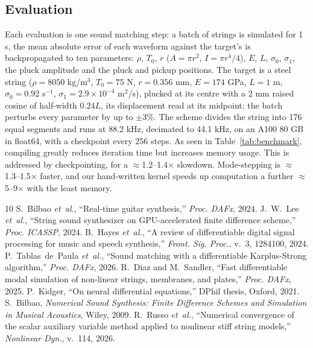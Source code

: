 \documentclass[a4paper]{article}
\newcommand{\step}{\rotatebox[origin=c]{180}{$\Lsh$}}
\begin{document}
\begin{sloppy}
\section{Evaluation}
Each evaluation is one sound matching step: a batch of strings is simulated
for 1 s, the mean absolute error of each waveform against the target's is backpropagated to ten parameters:
$\rho$, $T_0$, $r$ ($A=\pi r^2$, $I=\pi r^4/4$), $E$, $L$, $\sigma_0$,
$\sigma_1$, the pluck amplitude and the pluck and pickup positions. The target
is a steel string ($\rho=8050$ kg/m$^3$, $T_0=75$ N, $r=0.356$ mm, $E=174$ GPa,
$L=1$ m, $\sigma_0=0.92$ s$^{-1}$, $\sigma_1=2.9\times10^{-4}$ m$^2$/s), plucked
at its centre with a 2 mm raised cosine of half-width $0.24L$, its
displacement read at its midpoint; the batch perturbs every parameter by up to
$\pm3\%$. The scheme divides the string into 176 equal segments and runs
at 88.2 kHz, decimated to 44.1 kHz, on an A100 80 GB in float64, with a
checkpoint every 256 steps. As seen in Table~\ref{tab:benchmark}, compiling
greatly reduces iteration time but increases memory usage. This is
addressed by checkpointing, for a $\approx$1.2--1.4$\times$ slowdown.
Mode-stepping is $\approx$1.3--1.5$\times$ faster, and our hand-written
kernel speeds up computation a further $\approx$5--9$\times$ with the least
memory.

\begin{table}[t]
 \centering
 \setlength{\tabcolsep}{3.5pt}
 \renewcommand{\arraystretch}{0.86}
 \resizebox{\columnwidth}{!}{}
 \caption{Peak memory and time of one gradient step. \step: adds one ingredient to the row above; \textemdash: exceeds the A100\textquotesingle s 80\,GB.}
 \label{tab:benchmark}
\end{table}

{\footnotesize
\begin{thebibliography}{10}
 S.~Bilbao \emph{et~al.}, ``Real-time guitar synthesis,'' \emph{Proc. DAFx}, 2024.
 J.~W.~Lee \emph{et~al.}, ``String sound synthesizer on GPU-accelerated finite difference scheme,'' \emph{Proc. ICASSP}, 2024.
 B.~Hayes \emph{et~al.}, ``A review of differentiable digital signal processing for music and speech synthesis,'' \emph{Front. Sig. Proc.}, v.~3, 1284100, 2024.
 P.~Tablas~de~Paula \emph{et~al.}, ``Sound matching with a differentiable Karplus-Strong algorithm,'' \emph{Proc. DAFx}, 2026.
 R.~Diaz and M.~Sandler, ``Fast differentiable modal simulation of non-linear strings, membranes, and plates,'' \emph{Proc. DAFx}, 2025.
 P.~Kidger, ``On neural differential equations,'' DPhil thesis, Oxford, 2021.
 S.~Bilbao, \emph{Numerical Sound Synthesis: Finite Difference Schemes and Simulation in Musical Acoustics}, Wiley, 2009.
 R.~Russo \emph{et~al.}, ``Numerical convergence of the scalar auxiliary variable method applied to nonlinear stiff string models,'' \emph{Nonlinear Dyn.}, v.~114, 2026.
\end{thebibliography}}
\end{sloppy}
\end{document}
